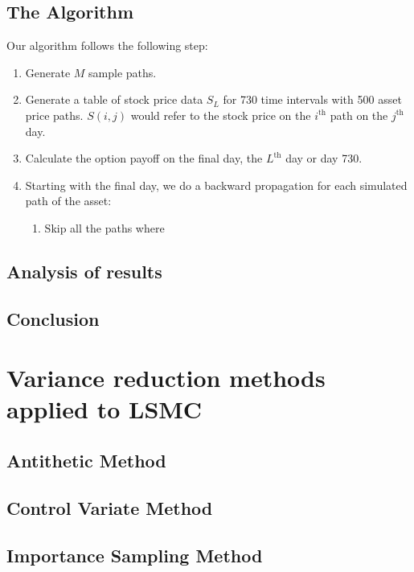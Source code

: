 \documentclass[12pt]{article}
\begin{document}
\subsection{The Algorithm}

Our algorithm follows the following step:

\begin{enumerate}
\item Generate $M$ sample paths.
\item Generate a table of stock price data $S_L$ for 730 time intervals with 500 asset price paths. $S(i,j)$ would refer to the stock price on the $i^\text{th}$ path on the $j^\text{th}$ day.
\item Calculate the option payoff on the final day, the $L^\text{th}$ day or day 730.
\item Starting with the final day, we do a backward propagation for each simulated path of the asset:
	\begin{enumerate}
	\item Skip all the paths where 
	\end{enumerate}
\end{enumerate}

\subsection{Analysis of results}

\subsection{Conclusion}

\section{Variance reduction methods applied to LSMC}

\subsection{Antithetic Method}

\subsection{Control Variate Method}

\subsection{Importance Sampling Method}
\end{document}
